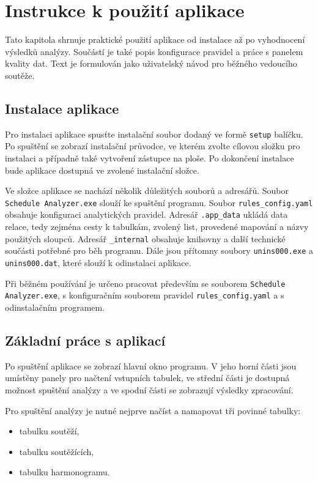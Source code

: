 \documentclass[czech, kiv, ba, he, iso690alph, pdf]{fasthesis}
\begin{document}
	\appendix
	
	\chapter{Instrukce k použití aplikace}
	
		Tato kapitola shrnuje praktické použití aplikace od instalace až po vyhodnocení výsledků analýzy. Součástí je také popis konfigurace pravidel a práce s panelem kvality dat. Text je formulován jako uživatelský návod pro běžného vedoucího soutěže.
	
		\section{Instalace aplikace}
	
			Pro instalaci aplikace spusťte instalační soubor dodaný ve formě \texttt{setup} balíčku. Po spuštění se zobrazí instalační průvodce, ve kterém zvolte cílovou složku pro instalaci a případně také vytvoření zástupce na ploše. Po dokončení instalace bude aplikace dostupná ve zvolené instalační složce.
	
			Ve složce aplikace se nachází několik důležitých souborů a adresářů. Soubor \texttt{Schedule Analyzer.exe} slouží ke spuštění programu. Soubor \texttt{rules\_config.yaml} obsahuje konfiguraci analytických pravidel. Adresář \texttt{.app\_data} ukládá data relace, tedy zejména cesty k tabulkám, zvolený list, provedené mapování a názvy použitých sloupců. Adresář \texttt{\_internal} obsahuje knihovny a další technické součásti potřebné pro běh programu. Dále jsou přítomny soubory \texttt{unins000.exe} a \texttt{unins000.dat}, které slouží k odinstalaci aplikace.
	
			Při běžném používání je určeno pracovat především se souborem \texttt{Schedule Analyzer.exe}, s konfiguračním souborem pravidel \texttt{rules\_config.yaml} a s odinstalačním programem.
	
		\section{Základní práce s aplikací}
	
			Po spuštění aplikace se zobrazí hlavní okno programu. V jeho horní části jsou umístěny panely pro načtení vstupních tabulek, ve střední části je dostupná možnost spuštění analýzy a ve spodní části se zobrazují výsledky zpracování.
	
			Pro spuštění analýzy je nutné nejprve načíst a namapovat tři povinné tabulky:
			\begin{itemize}
				\item tabulku soutěží,
				\item tabulku soutěžících,
				\item tabulku harmonogramu.
			\end{itemize}
	
\end{document}
